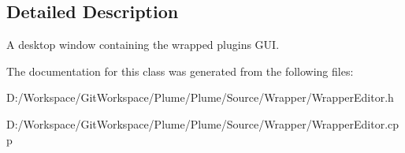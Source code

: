 \subsection{Detailed Description}
A desktop window containing the wrapped plugin\textquotesingle{}s G\+UI. 

The documentation for this class was generated from the following files\+:\begin{DoxyCompactItemize}
\item 
D\+:/\+Workspace/\+Git\+Workspace/\+Plume/\+Plume/\+Source/\+Wrapper/Wrapper\+Editor.\+h\item 
D\+:/\+Workspace/\+Git\+Workspace/\+Plume/\+Plume/\+Source/\+Wrapper/Wrapper\+Editor.\+cpp\end{DoxyCompactItemize}
